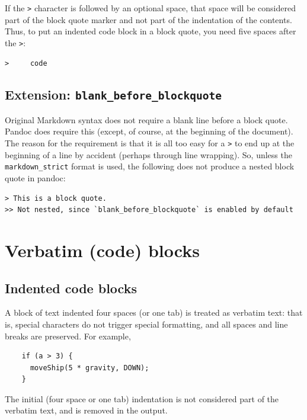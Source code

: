 \documentclass[
  b5paper
]{book}
\begin{document}
If the \texttt{\textgreater{}} character is followed by an optional
space, that space will be considered part of the block quote marker and
not part of the indentation of the contents. Thus, to put an indented
code block in a block quote, you need five spaces after the
\texttt{\textgreater{}}:

\begin{verbatim}
>     code
\end{verbatim}

\subsection{\texorpdfstring{Extension:
\texttt{blank\_before\_blockquote}}{Extension: blank\_before\_blockquote}}\label{extension-blank_before_blockquote}

Original Markdown syntax does not require a blank line before a block
quote. Pandoc does require this (except, of course, at the beginning of
the document). The reason for the requirement is that it is all too easy
for a \texttt{\textgreater{}} to end up at the beginning of a line by
accident (perhaps through line wrapping). So, unless the
\texttt{markdown\_strict} format is used, the following does not produce
a nested block quote in pandoc:

\begin{verbatim}
> This is a block quote.
>> Not nested, since `blank_before_blockquote` is enabled by default
\end{verbatim}

\section{Verbatim (code) blocks}\label{verbatim-code-blocks}

\subsection{Indented code blocks}\label{indented-code-blocks}

A block of text indented four spaces (or one tab) is treated as verbatim
text: that is, special characters do not trigger special formatting, and
all spaces and line breaks are preserved. For example,

\begin{verbatim}
    if (a > 3) {
      moveShip(5 * gravity, DOWN);
    }
\end{verbatim}

The initial (four space or one tab) indentation is not considered part
of the verbatim text, and is removed in the output.
\end{document}
